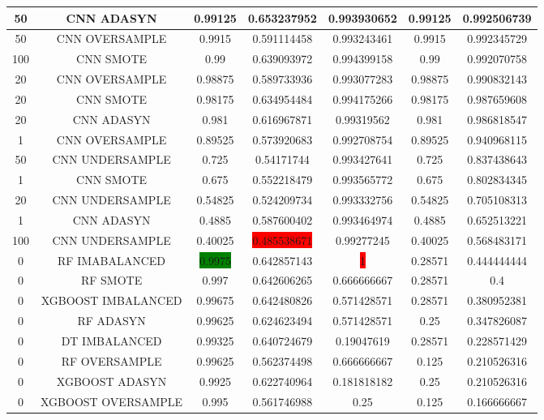 \begin{longtable}{|c|c|c|c|c|c|c|}
  	50 & CNN ADASYN & 0.99125 & 0.653237952 & 0.993930652 & 0.99125 & 0.992506739\\ \hline
  	50 & CNN OVERSAMPLE & 0.9915 & 0.591114458 & 0.993243461 & 0.9915 & 0.992345729\\ \hline
  	100 & CNN SMOTE & 0.99 & 0.639093972 & 0.994399158 & 0.99 & 0.992070758\\ \hline
  	20 & CNN OVERSAMPLE & 0.98875 & 0.589733936 & 0.993077283 & 0.98875 & 0.990832143\\ \hline
  	20 & CNN SMOTE & 0.98175 & 0.634954484 & 0.994175266 & 0.98175 & 0.987659608\\ \hline
  	20 & CNN ADASYN & 0.981 & 0.616967871 & 0.99319562 & 0.981 & 0.986818547\\ \hline
  	1 & CNN OVERSAMPLE & 0.89525 & 0.573920683 & 0.992708754 & 0.89525 & 0.940968115\\ \hline
  	50 & CNN UNDERSAMPLE & 0.725 & 0.54171744 & 0.993427641 & 0.725 & 0.837438643\\ \hline
  	1 & CNN SMOTE & 0.675 & 0.552218479 & 0.993565772 & 0.675 & 0.802834345\\ \hline
  	20 & CNN UNDERSAMPLE & 0.54825 & 0.524209734 & 0.993332756 & 0.54825 & 0.705108313\\ \hline
  	1 & CNN ADASYN & 0.4885 & 0.587600402 & 0.993464974 & 0.4885 & 0.652513221\\ \hline
  	100 & CNN UNDERSAMPLE & 0.40025 & \colorbox{red}{0.485538671} & 0.99277245 & 0.40025 & 0.568483171\\ \hline
  	0 & RF IMABALANCED & \colorbox{green}{0.9975} & 0.642857143 & \colorbox{red}{1} & 0.28571 & 0.444444444\\ \hline
  	0 & RF SMOTE & 0.997 & 0.642606265 & 0.666666667 & 0.28571 & 0.4\\ \hline
  	0 & XGBOOST IMBALANCED & 0.99675 & 0.642480826 & 0.571428571 & 0.28571 & 0.380952381\\ \hline
  	0 & RF ADASYN & 0.99625 & 0.624623494 & 0.571428571 & 0.25 & 0.347826087\\ \hline
  	0 & DT IMBALANCED & 0.99325 & 0.640724679 & 0.19047619 & 0.28571 & 0.228571429\\ \hline
  	0 & RF OVERSAMPLE & 0.99625 & 0.562374498 & 0.666666667 & 0.125 & 0.210526316\\ \hline
  	0 & XGBOOST ADASYN  & 0.9925 & 0.622740964 & 0.181818182 & 0.25 & 0.210526316\\ \hline
  	0 & XGBOOST OVERSAMPLE & 0.995 & 0.561746988 & 0.25 & 0.125 & 0.166666667\\ \hline

\end{longtable}
